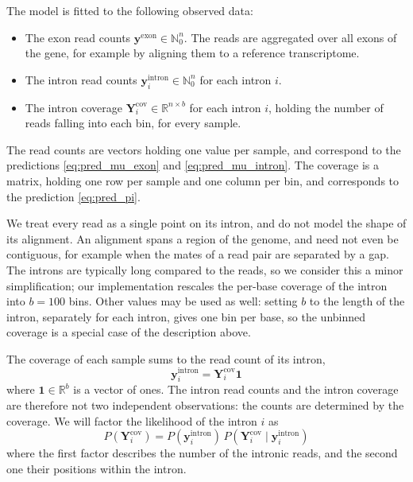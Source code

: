 \documentclass[11pt]{article}
\begin{document}
	The model is fitted to the following observed data:
	\begin{itemize}
		\item The exon read counts $\boldsymbol{y}^{\mathrm{exon}} \in \mathbb{N}_0^{n}$. The reads are aggregated over all exons of the gene, for example by aligning them to a reference transcriptome.
		\item The intron read counts $\boldsymbol{y}^{\mathrm{intron}}_{i} \in \mathbb{N}_0^{n}$ for each intron $i$.
		\item The intron coverage $\boldsymbol{Y}^{\mathrm{cov}}_{i} \in \mathbb{R}^{n \times b}$ for each intron $i$, holding the number of reads falling into each bin, for every sample.
	\end{itemize}
	The read counts are vectors holding one value per sample, and correspond to the predictions \eqref{eq:pred_mu_exon} and \eqref{eq:pred_mu_intron}. The coverage is a matrix, holding one row per sample and one column per bin, and corresponds to the prediction \eqref{eq:pred_pi}.

	We treat every read as a single point on its intron, and do not model the shape of its alignment. An alignment spans a region of the genome, and need not even be contiguous, for example when the mates of a read pair are separated by a gap. The introns are typically long compared to the reads, so we consider this a minor simplification; our implementation rescales the per-base coverage of the intron into $b = 100$ bins. Other values may be used as well: setting $b$ to the length of the intron, separately for each intron, gives one bin per base, so the unbinned coverage is a special case of the description above.

	The coverage of each sample sums to the read count of its intron,
	\begin{equation} \label{eq:coverage_row_sums}
		\boldsymbol{y}^{\mathrm{intron}}_{i} = \boldsymbol{Y}^{\mathrm{cov}}_{i} \boldsymbol{1}
	\end{equation}
	where $\boldsymbol{1} \in \mathbb{R}^{b}$ is a vector of ones. The intron read counts and the intron coverage are therefore not two independent observations: the counts are determined by the coverage. We will factor the likelihood of the intron $i$ as
	\begin{equation} \label{eq:intron_factorization}
		P(\boldsymbol{Y}^{\mathrm{cov}}_{i}) = P(\boldsymbol{y}^{\mathrm{intron}}_{i}) \, P(\boldsymbol{Y}^{\mathrm{cov}}_{i} \mid \boldsymbol{y}^{\mathrm{intron}}_{i})
	\end{equation}
	where the first factor describes the number of the intronic reads, and the second one their positions within the intron.
\end{document}
